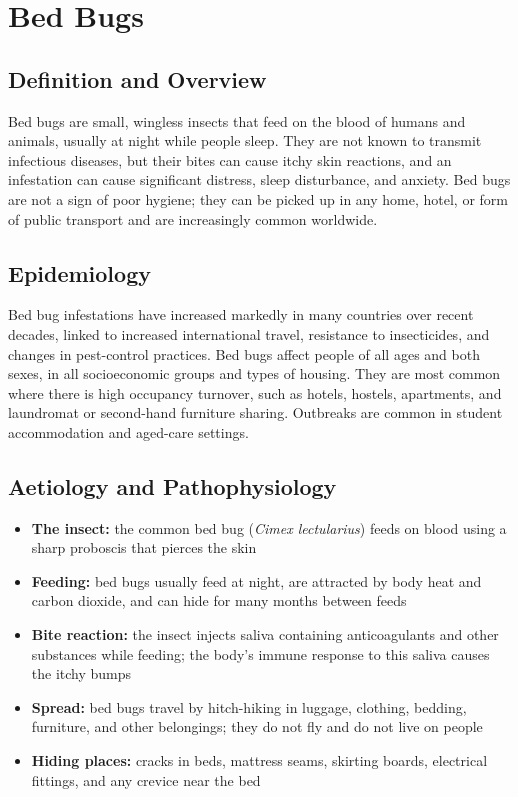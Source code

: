 \chapter{Bed Bugs}

\section*{Definition and Overview}
Bed bugs are small, wingless insects that feed on the blood of humans and animals, usually at night while people sleep. They are not known to transmit infectious diseases, but their bites can cause itchy skin reactions, and an infestation can cause significant distress, sleep disturbance, and anxiety. Bed bugs are not a sign of poor hygiene; they can be picked up in any home, hotel, or form of public transport and are increasingly common worldwide.

\section*{Epidemiology}
Bed bug infestations have increased markedly in many countries over recent decades, linked to increased international travel, resistance to insecticides, and changes in pest-control practices. Bed bugs affect people of all ages and both sexes, in all socioeconomic groups and types of housing. They are most common where there is high occupancy turnover, such as hotels, hostels, apartments, and laundromat or second-hand furniture sharing. Outbreaks are common in student accommodation and aged-care settings.

\section*{Aetiology and Pathophysiology}
\begin{itemize}
    \item \textbf{The insect:} the common bed bug (\textit{Cimex lectularius}) feeds on blood using a sharp proboscis that pierces the skin
    \item \textbf{Feeding:} bed bugs usually feed at night, are attracted by body heat and carbon dioxide, and can hide for many months between feeds
    \item \textbf{Bite reaction:} the insect injects saliva containing anticoagulants and other substances while feeding; the body's immune response to this saliva causes the itchy bumps
    \item \textbf{Spread:} bed bugs travel by hitch-hiking in luggage, clothing, bedding, furniture, and other belongings; they do not fly and do not live on people
    \item \textbf{Hiding places:} cracks in beds, mattress seams, skirting boards, electrical fittings, and any crevice near the bed
\end{itemize}

